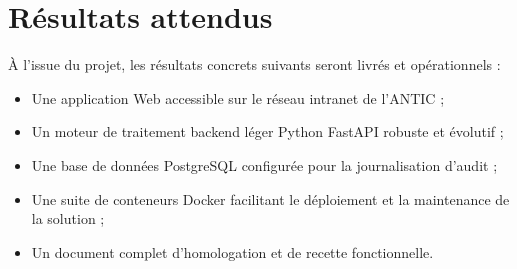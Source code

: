 \section{Résultats attendus}

À l'issue du projet, les résultats concrets suivants seront livrés et opérationnels :
\begin{itemize}
    \item Une application Web accessible sur le réseau intranet de l'ANTIC ;
    \item Un moteur de traitement backend léger Python FastAPI robuste et évolutif ;
    \item Une base de données PostgreSQL configurée pour la journalisation d'audit ;
    \item Une suite de conteneurs Docker facilitant le déploiement et la maintenance de la solution ;
    \item Un document complet d'homologation et de recette fonctionnelle.
\end{itemize}
